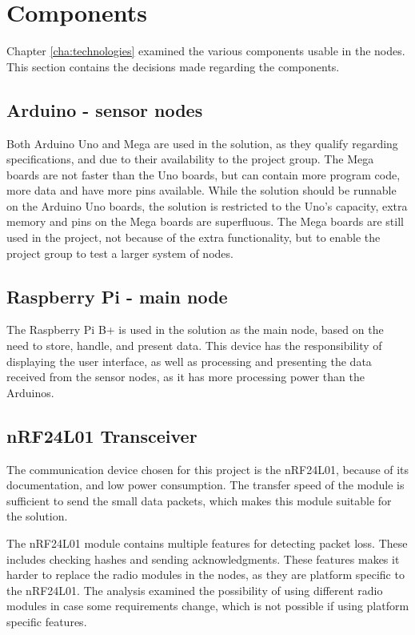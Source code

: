 \section{Components}
Chapter \ref{cha:technologies} examined the various components usable in the nodes. This section contains the decisions made regarding the components.

\subsection*{Arduino - sensor nodes}
Both Arduino Uno and Mega are used in the solution, as they qualify regarding specifications, and due to their availability to the project group. The Mega boards are not faster than the Uno boards, but can contain more program code, more data and have more pins available. While the solution should be runnable on the Arduino Uno boards, the solution is restricted to the Uno's capacity, extra memory and pins on the Mega boards are superfluous. The Mega boards are still used in the project, not because of the extra functionality, but to enable the project group to test a larger system of nodes.

\subsection*{Raspberry Pi - main node}
The Raspberry Pi B+ is used in the solution as the main node, based on the need to store, handle, and present data. This device has the responsibility of displaying the user interface, as well as processing and presenting the data received from the sensor nodes, as it has more processing power than the Arduinos.


\subsection*{nRF24L01 Transceiver}
The communication device chosen for this project is the nRF24L01, because of its documentation, and low power consumption. The transfer speed of the module is sufficient to send the small data packets, which makes this module suitable for the solution.

The nRF24L01 module contains multiple features for detecting packet loss. These includes checking hashes and sending acknowledgments\cite{nf24datasheet}. These features makes it harder to replace the radio modules in the nodes, as they are platform specific to the nRF24L01. The analysis examined the possibility of using different radio modules in case some requirements change, which is not possible if using platform specific features.

